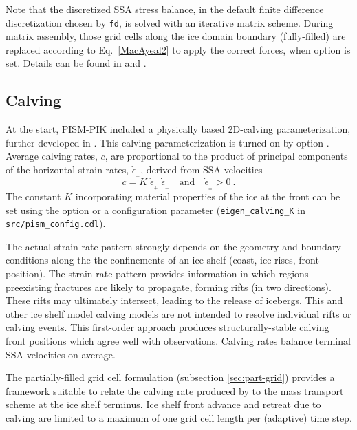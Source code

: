 Note that the discretized SSA stress balance, in the default finite difference discretization chosen by  \texttt{fd}, is solved with an iterative matrix scheme. During matrix assembly, those grid cells along the ice domain boundary (fully-filled) are replaced according to Eq.~\eqref{MacAyeal2} to apply the correct forces, when option  is set.  Details can be found in \cite{Winkelmannetal2011} and \cite{Albrechtetal2011}.  

\subsection{Calving}
\label{sec:calving}
At the start, PISM-PIK included a physically based 2D-calving parameterization, further developed in \cite{Levermannetal2012}. This calving parameterization is turned on by option .  Average calving rates, $c$, are proportional to the product of principal components of the horizontal strain rates, $\dot{\epsilon}_{_\pm}$, derived from SSA-velocities 
\begin{equation}
\label{eq: calv2}
c = K\; \dot{\epsilon}_{_+}\; \dot{\epsilon}_{_-}\quad\text{and}\quad\dot{\epsilon}_{_\pm}>0\:.
\end{equation}
The constant $K$ incorporating material properties of the ice at the front can be set using the  option or a configuration parameter (\texttt{eigen_calving_K} in \texttt{src/pism_config.cdl}).

The actual strain rate pattern strongly depends on the geometry and boundary conditions along the the confinements of an ice shelf (coast, ice rises, front position).  The strain rate pattern provides information in which regions preexisting fractures are likely to propagate, forming rifts (in two directions).  These rifts may ultimately intersect, leading to the release of icebergs. This and other ice shelf model calving models are not intended to resolve individual rifts or calving events. This first-order approach produces structurally-stable calving front positions which agree well with observations.  Calving rates balance terminal SSA velocities on average.

The partially-filled grid cell formulation (subsection \ref{sec:part-grid}) provides a framework suitable to relate the calving rate produced by  to the mass transport scheme at the ice shelf terminus.  Ice shelf front advance and retreat due to calving are limited to a maximum of one grid cell length per (adaptive) time step.

